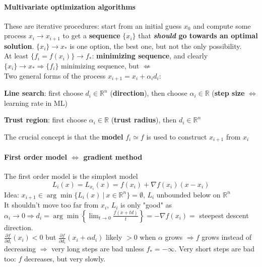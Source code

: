 \documentclass[10pt]{report}
\begin{document}
\paragraph{Multivariate optimization algorithms} These are iterative procedures: start from an initial guess $x_0$ and compute some process $x_i \longrightarrow x_{i+1}$ to get a \textbf{sequence} $\{x_i\}$ that \textbf{\textit{should} go towards an optimal solution}. $\{x_i\}\rightarrow x_*$ is one option, the best one, but not the only possibility.\\
At least $\{f_i = f(x_i)\} \rightarrow f_*$: \textbf{minimizing sequence}, and clearly $\{x_i\}\rightarrow x_* \Rightarrow \{f_i\}$ minimizing sequence, but $\not\Leftarrow$\\
Two general forms of the process $x_{i+1} = x_i + \alpha_id_i$:
\begin{list}{}{}
	\item \textbf{Line search}: first choose $d_i\in \mathbb{R}^n$ (\textbf{direction}), then choose $\alpha_i\in \mathbb{R}$ (\textbf{step size} $\Leftrightarrow$ learning rate in ML)
	\item \textbf{Trust region}: first choose $\alpha_i\in \mathbb{R}$ (\textbf{trust radius}), then $d_i\in \mathbb{R}^n$
\end{list}
The crucial concept is that the \textbf{model} $f_i \simeq f$ is used to construct $x_{i+1}$ from $x_i$
\paragraph{First order model $\Leftrightarrow$ gradient method} The first order model is the simplest model $$L_i(x) = L_{x_i}(x) = f(x_i) + \nabla f(x_i)(x-x_i)$$ Idea: $x_{i+1} \in \arg\min\{L_i(x)\:|\:x\in \mathbb{R}^n\} = \emptyset$, $L_i$ unbounded below on $\mathbb{R}^n$\\
It shouldn't move too far from $x_i$, $L_i$ is only "good" as $\alpha_i\rightarrow 0 \Rightarrow d_i = \arg\min\left\{\lim_{t\to 0} \frac{f(x+td)}{t}\right\} = -\nabla f(x_i) =$ steepest descent direction.\\
$\frac{\partial f}{\partial d_i}(x_i) < 0$ but $\frac{\partial f}{\partial d_i}(x_i + \alpha d_i)$ likely $> 0$ when $\alpha$ grows $\Rightarrow f$ grows instead of decreasing $\Rightarrow$ very long steps are bad unless $f_* = -\infty$. Very short steps are bad too: $f$ decreases, but very slowly.
\end{document}
